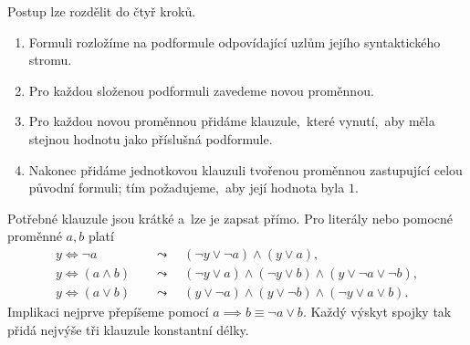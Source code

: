 Postup lze rozdělit do čtyř kroků.
\begin{enumerate}
    \item Formuli rozložíme na podformule odpovídající uzlům jejího syntaktického stromu.
    \item Pro každou složenou podformuli zavedeme novou proměnnou.
    \item Pro každou novou proměnnou přidáme klauzule,~které vynutí,~aby měla stejnou hodnotu jako příslušná podformule.
    \item Nakonec přidáme jednotkovou klauzuli tvořenou proměnnou zastupující celou původní formuli; tím požadujeme,~aby její hodnota byla $1$.
\end{enumerate}

Potřebné klauzule jsou krátké a~lze je zapsat přímo. Pro literály nebo pomocné proměnné $a,b$ platí
\begin{align}
y\iff\neg a
    &\quad\leadsto\quad(\neg y\lor\neg a)\land(y\lor a),\label{eq:tseitin-neg}\\
y\iff(a\land b)
    &\quad\leadsto\quad(\neg y\lor a)\land(\neg y\lor b)\land(y\lor\neg a\lor\neg b),\label{eq:tseitin-and}\\
y\iff(a\lor b)
    &\quad\leadsto\quad(y\lor\neg a)\land(y\lor\neg b)\land(\neg y\lor a\lor b).\label{eq:tseitin-or}
\end{align}
Implikaci nejprve přepíšeme pomocí $a\implies b\equiv\neg a\lor b$. Každý výskyt spojky tak přidá nejvýše tři klauzule konstantní délky.

